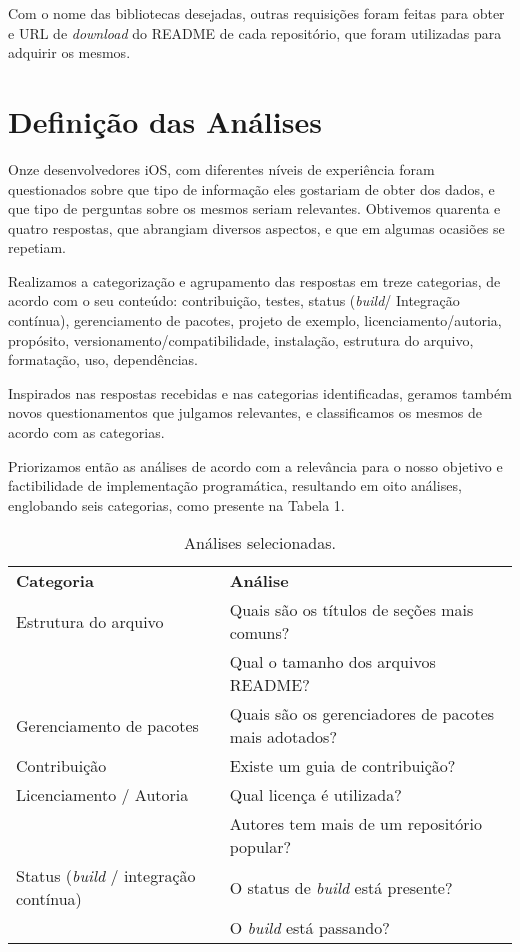 \documentclass[preprint,12pt,authoryear]{elsarticle}
\begin{document}
Com o nome das bibliotecas desejadas, outras requisições foram feitas para obter e URL de \textit{download} do README de cada repositório, que foram utilizadas para adquirir os mesmos.


\section{Definição das Análises}
Onze desenvolvedores iOS, com diferentes níveis de experiência foram questionados sobre que tipo de informação eles gostariam de obter dos dados, e que tipo de perguntas sobre os mesmos seriam relevantes. Obtivemos quarenta e quatro respostas, que abrangiam diversos aspectos, e que em algumas ocasiões se repetiam.

Realizamos a categorização e agrupamento das respostas em treze categorias, de acordo com o seu conteúdo: contribuição, testes, status (\textit{build}/ Integração contínua), gerenciamento de pacotes, projeto de exemplo, licenciamento/autoria, propósito, versionamento/compatibilidade, instalação, estrutura do arquivo, formatação, uso, dependências.

Inspirados nas respostas recebidas e nas categorias identificadas, geramos também novos questionamentos que julgamos relevantes, e classificamos os mesmos de acordo com as categorias.

Priorizamos então as análises de acordo com a relevância para o nosso objetivo e factibilidade de implementação programática, resultando em oito análises, englobando seis categorias, como presente na Tabela 1.

\begin{table}[]
\begin{tabular}{ll}
\textbf{Categoria}                   & \textbf{Análise}                                     \\
Estrutura do arquivo                 & Quais são os títulos de seções mais comuns?         \\
                                     & Qual o tamanho dos arquivos README?                  \\
Gerenciamento de pacotes             & Quais são os gerenciadores de pacotes mais adotados? \\
Contribuição                         & Existe um guia de contribuição?                      \\
Licenciamento / Autoria              & Qual licença é utilizada?                            \\
                                     & Autores tem mais de um repositório popular?          \\
Status (\textit{build} / integração contínua) & O status de \textit{build} está presente?                     \\
                                     & O \textit{build} está passando?                              
\end{tabular}
\caption{Análises selecionadas.}
\end{table}
\end{document}

